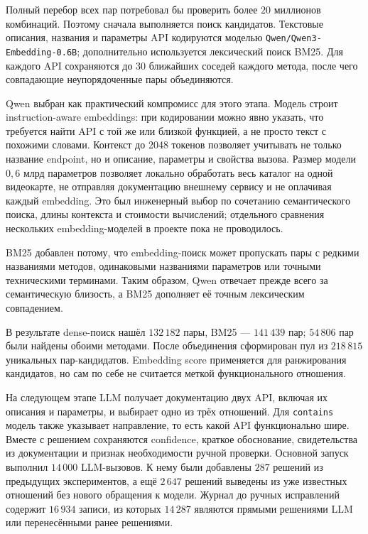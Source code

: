 \documentclass[12pt,a4paper]{article}
\begin{document}
Полный перебор всех пар потребовал бы проверить более $20$ миллионов
комбинаций. Поэтому сначала выполняется поиск кандидатов. Текстовые описания,
названия и параметры API кодируются моделью
\texttt{Qwen/Qwen3-Embedding-0.6B}; дополнительно используется лексический
поиск BM25. Для каждого API сохраняются до 30 ближайших соседей каждого метода,
после чего совпадающие неупорядоченные пары объединяются.

Qwen выбран как практический компромисс для этого этапа. Модель строит
instruction-aware embeddings: при кодировании можно явно указать, что требуется
найти API с той же или близкой функцией, а не просто текст с похожими словами.
Контекст до 2048 токенов позволяет учитывать не только название endpoint, но и
описание, параметры и свойства вызова. Размер модели $0{,}6$ млрд параметров
позволяет локально обработать весь каталог на одной видеокарте, не отправляя
документацию внешнему сервису и не оплачивая каждый embedding. Это был
инженерный выбор по сочетанию семантического поиска, длины контекста и стоимости
вычислений; отдельного сравнения нескольких embedding-моделей в проекте пока
не проводилось.

BM25 добавлен потому, что embedding-поиск может пропускать пары с редкими
названиями методов, одинаковыми названиями параметров или точными техническими
терминами. Таким образом, Qwen отвечает прежде всего за семантическую близость,
а BM25 дополняет её точным лексическим совпадением.

В результате dense-поиск нашёл $132\,182$ пары, BM25 --- $141\,439$ пар;
$54\,806$ пар были найдены обоими методами. После объединения сформирован пул
из $218\,815$ уникальных пар-кандидатов. Embedding score применяется для
ранжирования кандидатов, но сам по себе не считается меткой функционального
отношения.

На следующем этапе LLM получает документацию двух API, включая их описания и
параметры, и выбирает одно из трёх отношений. Для \texttt{contains} модель
также указывает направление, то есть какой API функционально шире. Вместе с
решением сохраняются confidence, краткое обоснование, свидетельства из
документации и признак необходимости ручной проверки. Основной запуск выполнил
$14\,000$ LLM-вызовов. К нему были добавлены $287$ решений из предыдущих
экспериментов, а ещё $2\,647$ решений выведены
из уже известных отношений без нового обращения к модели. Журнал до ручных
исправлений содержит $16\,934$ записи, из которых $14\,287$ являются прямыми
решениями LLM или перенесёнными ранее решениями.
\end{document}
